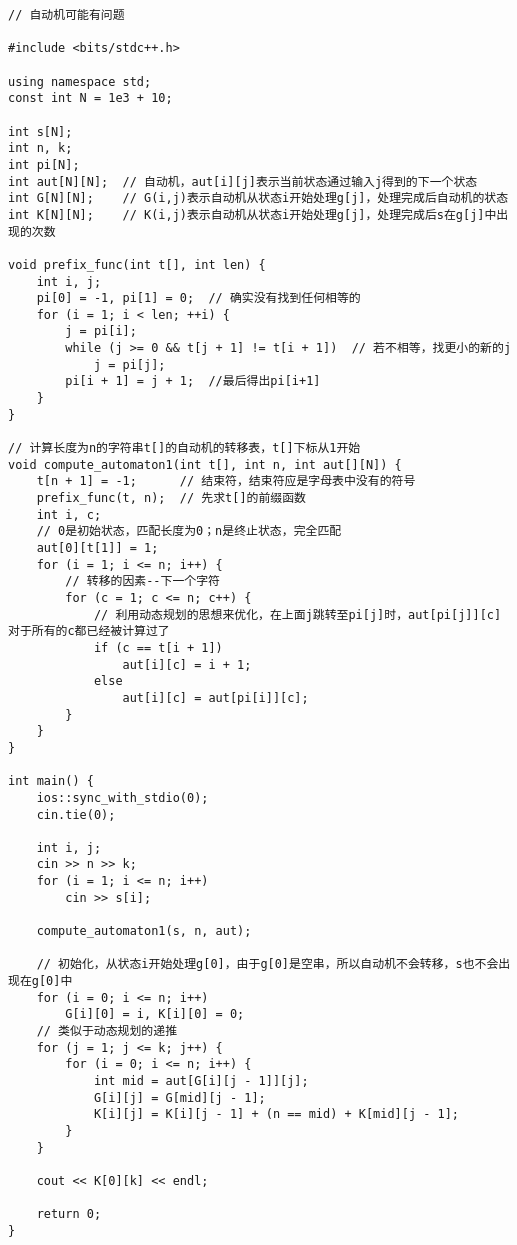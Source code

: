         \begin{lstlisting}
// 自动机可能有问题

#include <bits/stdc++.h>

using namespace std;
const int N = 1e3 + 10;

int s[N];
int n, k;
int pi[N];
int aut[N][N];  // 自动机，aut[i][j]表示当前状态通过输入j得到的下一个状态
int G[N][N];    // G(i,j)表示自动机从状态i开始处理g[j]，处理完成后自动机的状态
int K[N][N];    // K(i,j)表示自动机从状态i开始处理g[j]，处理完成后s在g[j]中出现的次数

void prefix_func(int t[], int len) {
    int i, j;
    pi[0] = -1, pi[1] = 0;  // 确实没有找到任何相等的
    for (i = 1; i < len; ++i) {
        j = pi[i];
        while (j >= 0 && t[j + 1] != t[i + 1])  // 若不相等，找更小的新的j
            j = pi[j];
        pi[i + 1] = j + 1;  //最后得出pi[i+1]
    }
}

// 计算长度为n的字符串t[]的自动机的转移表，t[]下标从1开始
void compute_automaton1(int t[], int n, int aut[][N]) {
    t[n + 1] = -1;      // 结束符，结束符应是字母表中没有的符号
    prefix_func(t, n);  // 先求t[]的前缀函数
    int i, c;
    // 0是初始状态，匹配长度为0；n是终止状态，完全匹配
    aut[0][t[1]] = 1;
    for (i = 1; i <= n; i++) {
        // 转移的因素--下一个字符
        for (c = 1; c <= n; c++) {
            // 利用动态规划的思想来优化，在上面j跳转至pi[j]时，aut[pi[j]][c]对于所有的c都已经被计算过了
            if (c == t[i + 1])
                aut[i][c] = i + 1;
            else
                aut[i][c] = aut[pi[i]][c];
        }
    }
}

int main() {
    ios::sync_with_stdio(0);
    cin.tie(0);

    int i, j;
    cin >> n >> k;
    for (i = 1; i <= n; i++)
        cin >> s[i];

    compute_automaton1(s, n, aut);

    // 初始化，从状态i开始处理g[0]，由于g[0]是空串，所以自动机不会转移，s也不会出现在g[0]中
    for (i = 0; i <= n; i++)
        G[i][0] = i, K[i][0] = 0;
    // 类似于动态规划的递推
    for (j = 1; j <= k; j++) {
        for (i = 0; i <= n; i++) {
            int mid = aut[G[i][j - 1]][j];
            G[i][j] = G[mid][j - 1];
            K[i][j] = K[i][j - 1] + (n == mid) + K[mid][j - 1];
        }
    }

    cout << K[0][k] << endl;

    return 0;
}
        \end{lstlisting}
